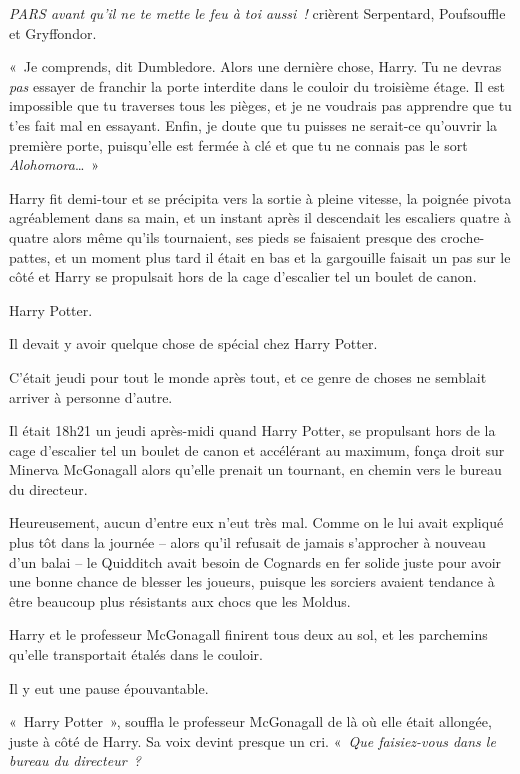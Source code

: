 \emph{PARS avant qu'il ne te mette le feu à toi aussi~!} crièrent Serpentard, Poufsouffle et Gryffondor.

«~Je comprends, dit Dumbledore. Alors une dernière chose, Harry. Tu ne devras \emph{pas} essayer de franchir la porte interdite dans le couloir du troisième étage. Il est impossible que tu traverses tous les pièges, et je ne voudrais pas apprendre que tu t'es fait mal en essayant. Enfin, je doute que tu puisses ne serait-ce qu'ouvrir la première porte, puisqu'elle est fermée à clé et que tu ne connais pas le sort \emph{Alohomora}…~»

Harry fit demi-tour et se précipita vers la sortie à pleine vitesse, la poignée pivota agréablement dans sa main, et un instant après il descendait les escaliers quatre à quatre alors même qu'ils tournaient, ses pieds se faisaient presque des croche-pattes, et un moment plus tard il était en bas et la gargouille faisait un pas sur le côté et Harry se propulsait hors de la cage d'escalier tel un boulet de canon.

\later

Harry Potter.

Il devait y avoir quelque chose de spécial chez Harry Potter.

C'était jeudi pour tout le monde après tout, et ce genre de choses ne semblait arriver à personne d'autre.

Il était 18h21 un jeudi après-midi quand Harry Potter, se propulsant hors de la cage d'escalier tel un boulet de canon et accélérant au maximum, fonça droit sur Minerva McGonagall alors qu'elle prenait un tournant, en chemin vers le bureau du directeur.

Heureusement, aucun d'entre eux n'eut très mal. Comme on le lui avait expliqué plus tôt dans la journée -- alors qu'il refusait de jamais s'approcher à nouveau d'un balai -- le Quidditch avait besoin de Cognards en fer solide juste pour avoir une bonne chance de blesser les joueurs, puisque les sorciers avaient tendance à être beaucoup plus résistants aux chocs que les Moldus.

Harry et le professeur McGonagall finirent tous deux au sol, et les parchemins qu'elle transportait étalés dans le couloir.

Il y eut une pause épouvantable.

«~Harry Potter~», souffla le professeur McGonagall de là où elle était allongée, juste à côté de Harry. Sa voix devint presque un cri. «~\emph{Que faisiez-vous dans le bureau du directeur~?}

